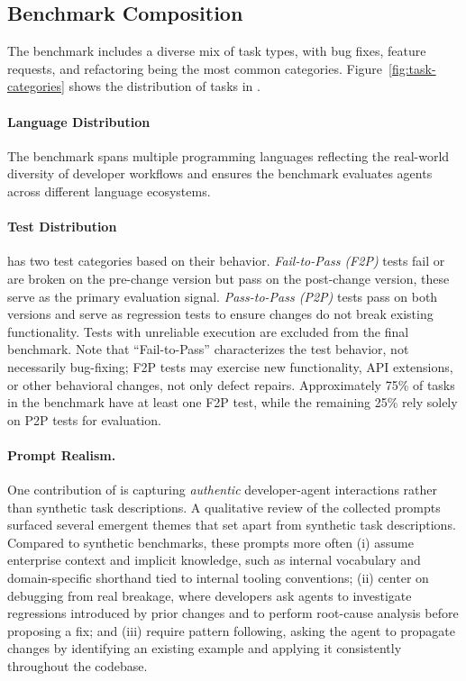 \subsection{Benchmark Composition}
\label{sec:benchmark}

\label{subsec:distribution}

The benchmark includes a diverse mix of task types, with bug fixes, feature requests, and refactoring being the most common categories. Figure~\ref{fig:task-categories} shows the distribution of tasks in \benchmark{}.

\paragraph{Language Distribution} The benchmark spans multiple programming languages reflecting the real-world diversity of developer workflows and ensures the benchmark evaluates agents across different language ecosystems.

\paragraph{Test Distribution} \benchmark{} has two test categories based on their behavior. \textit{Fail-to-Pass (F2P)} tests fail or are broken on the pre-change version but pass on the post-change version, these serve as the primary evaluation signal. \textit{Pass-to-Pass (P2P)} tests pass on both versions and serve as regression tests to ensure changes do not break existing functionality. Tests with unreliable execution are excluded from the final benchmark. Note that ``Fail-to-Pass'' characterizes the test behavior, not necessarily bug-fixing; F2P tests may exercise new functionality, API extensions, or other behavioral changes, not only defect repairs. Approximately 75\% of tasks in the benchmark have at least one F2P test, while the remaining 25\% rely solely on P2P tests for evaluation.

\paragraph{Prompt Realism.}
One contribution of \benchmark{} is capturing \textit{authentic} developer-agent interactions rather than synthetic task descriptions.
A qualitative review of the collected prompts surfaced several emergent themes that set \benchmark{} apart from synthetic task descriptions.
Compared to synthetic benchmarks, these prompts more often (i) assume enterprise context and implicit knowledge, such as internal vocabulary and domain-specific shorthand tied to internal tooling conventions; (ii) center on debugging from real breakage, where developers ask agents to investigate regressions introduced by prior changes and to perform root-cause analysis before proposing a fix; and (iii) require pattern following, asking the agent to propagate changes by identifying an existing example and applying it consistently throughout the codebase.

